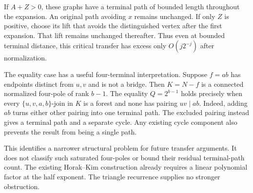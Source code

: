 If $A+Z>0$, these graphs have a terminal path of bounded length throughout the expansion.
An original path avoiding $x$ remains unchanged.
If only $Z$ is positive, choose its lift that avoids the distinguished vertex after the first expansion.
That lift remains unchanged thereafter.
Thus even at bounded terminal distance, this critical transfer has excess only $O(j2^{-j})$ after normalization.

The equality case has a useful four-terminal interpretation.
Suppose $f=ab$ has endpoints distinct from $u,v$ and is not a bridge.
Then $K=N-f$ is a connected normalized four-pole of rank $b-1$.
The equality $Q=2^{b-1}$ holds precisely when every $\{u,v,a,b\}$-join in $K$ is a forest and none has pairing $uv\mid ab$.
Indeed, adding $ab$ turns either other pairing into one terminal path.
The excluded pairing instead gives a terminal path and a separate cycle.
Any existing cycle component also prevents the result from being a single path.

This identifies a narrower structural problem for future transfer arguments.
It does not classify such saturated four-poles or bound their residual terminal-path count.
The existing Horak--Kim construction already requires a linear polynomial factor at the half exponent.
The triangle recurrence supplies no stronger obstruction.
